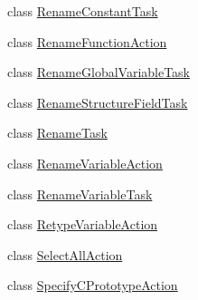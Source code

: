 \begin{DoxyCompactItemize}
\item 
class \mbox{\hyperlink{classghidra_1_1app_1_1plugin_1_1core_1_1decompile_1_1actions_1_1_rename_constant_task}{Rename\+Constant\+Task}}
\item 
class \mbox{\hyperlink{classghidra_1_1app_1_1plugin_1_1core_1_1decompile_1_1actions_1_1_rename_function_action}{Rename\+Function\+Action}}
\item 
class \mbox{\hyperlink{classghidra_1_1app_1_1plugin_1_1core_1_1decompile_1_1actions_1_1_rename_global_variable_task}{Rename\+Global\+Variable\+Task}}
\item 
class \mbox{\hyperlink{classghidra_1_1app_1_1plugin_1_1core_1_1decompile_1_1actions_1_1_rename_structure_field_task}{Rename\+Structure\+Field\+Task}}
\item 
class \mbox{\hyperlink{classghidra_1_1app_1_1plugin_1_1core_1_1decompile_1_1actions_1_1_rename_task}{Rename\+Task}}
\item 
class \mbox{\hyperlink{classghidra_1_1app_1_1plugin_1_1core_1_1decompile_1_1actions_1_1_rename_variable_action}{Rename\+Variable\+Action}}
\item 
class \mbox{\hyperlink{classghidra_1_1app_1_1plugin_1_1core_1_1decompile_1_1actions_1_1_rename_variable_task}{Rename\+Variable\+Task}}
\item 
class \mbox{\hyperlink{classghidra_1_1app_1_1plugin_1_1core_1_1decompile_1_1actions_1_1_retype_variable_action}{Retype\+Variable\+Action}}
\item 
class \mbox{\hyperlink{classghidra_1_1app_1_1plugin_1_1core_1_1decompile_1_1actions_1_1_select_all_action}{Select\+All\+Action}}
\item 
class \mbox{\hyperlink{classghidra_1_1app_1_1plugin_1_1core_1_1decompile_1_1actions_1_1_specify_c_prototype_action}{Specify\+C\+Prototype\+Action}}
\end{DoxyCompactItemize}
